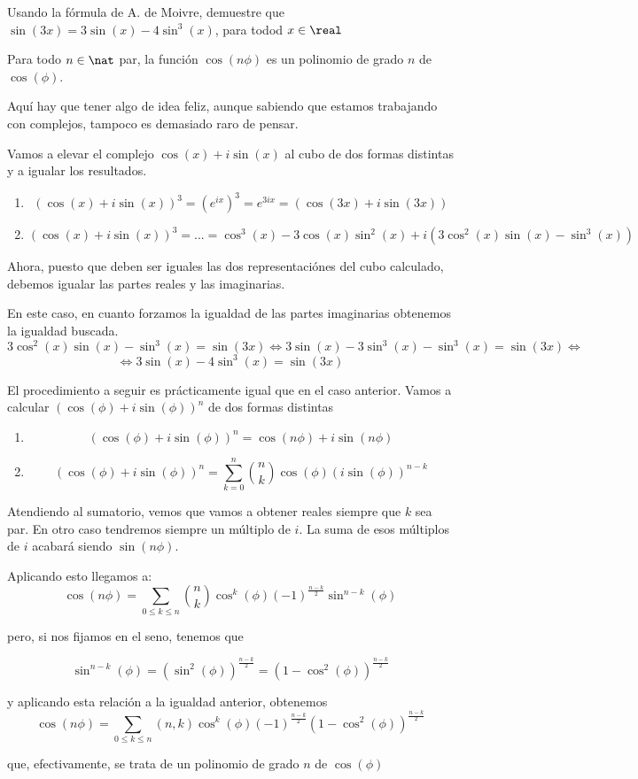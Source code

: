\begin{problem}[6]
Usando la fórmula de A. de Moivre, demuestre que
\ppart
$\sin(3x)=3\sin(x)-4 \sin^3(x)$, para todod $x \in \real$

\ppart
Para todo $n \in \nat$ par, la función $\cos(n \phi)$ es un polinomio de grado $n$ de $\cos(\phi)$.

\solution

\spart
Aquí hay que tener algo de idea feliz, aunque sabiendo que estamos trabajando con complejos, tampoco es demasiado raro de pensar.

Vamos a elevar el complejo $\cos(x)+i \sin(x)$ al cubo de dos formas distintas y a igualar los resultados.

\begin{enumerate}
\item
\[\left( \cos(x)+i \sin (x) \right)^3 = (e^{ix})^3 = e^{3ix} = \left( \cos(3x)+i \sin (3x) \right)\]
\item
\[\left( \cos(x)+i \sin (x) \right)^3 = . . . = \cos^3(x)-3\cos(x)\sin^2(x) + i \left( 3\cos^2(x)\sin(x)-\sin^3(x)\right)\]
\end{enumerate}
Ahora, puesto que deben ser iguales las dos representaciónes del cubo calculado, debemos igualar las partes reales y las imaginarias.

En este caso, en cuanto forzamos la igualdad de las partes imaginarias obtenemos la igualdad buscada.
\[3\cos^2(x)\sin(x)-\sin^3(x) = \sin(3x) \iff 3\sin(x) - 3 \sin^3(x) - \sin^3(x)=\sin(3x) \iff\]
\[\iff 3\sin(x) - 4 \sin^3(x)=\sin(3x) \]

\spart
El procedimiento a seguir es prácticamente igual que en el caso anterior. Vamos a calcular $\left(\cos(\phi)+i\sin(\phi)\right)^n$ de dos formas distintas
\begin{enumerate}
\item
\[\left(\cos(\phi)+i\sin(\phi)\right)^n = \cos(n\phi)+i\sin(n\phi)\]
\item
\[\left(\cos(\phi)+i\sin(\phi)\right)^n = \sum_{k=0}^n { n \choose k} \cos(\phi)\left( i \sin (\phi)\right)^{n-k}\]
\end{enumerate}

Atendiendo al sumatorio, vemos que vamos a obtener reales siempre que $k$ sea par. En otro caso tendremos siempre un múltiplo de $i$. La suma de esos múltiplos de $i$ acabará siendo $\sin (n\phi)$.

Aplicando esto llegamos a:
\[\cos(n\phi) = \sum_{0 \leq k \leq n} { n \choose k} \cos^k(\phi)(-1)^{\frac{n-k}{2}}\sin^{n-k}(\phi)\]

pero, si nos fijamos en el seno, tenemos que

\[\sin^{n-k}(\phi) = \left(\sin^2(\phi)\right)^{\frac{n-k}{2}} = \left(1-\cos^2(\phi)\right)^{\frac{n-k}{2}}\]

y aplicando esta relación a la igualdad anterior, obtenemos
\[\cos(n\phi) = \sum_{0 \leq k \leq n} (n,k) \cos^k(\phi)(-1)^{\frac{n-k}{2}}\left(1-\cos^2(\phi)\right)^{\frac{n-k}{2}}\]

que, efectivamente, se trata de un polinomio de grado $n$ de $\cos(\phi)$
\end{problem}

